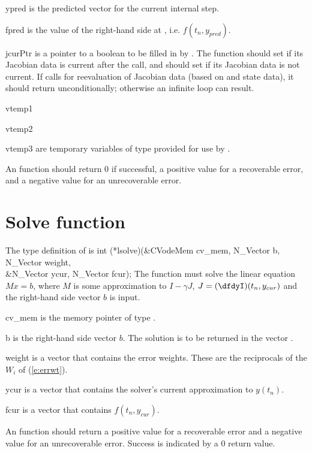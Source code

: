 {\begin{args}[convfail]
   \item[ypred]
     is the predicted  vector for the current {\cvodes} internal step.
  
   \item[fpred]
     is the value of the right-hand side at , i.e. $f(t_n, y_{pred})$.
  
   \item[jcurPtr]
     is a pointer to a boolean to be filled in by .  
     The function should set  if its Jacobian 
     data is current after the call, and should set         
      if its Jacobian data is not current.   
     If  calls for reevaluation of         
     Jacobian data (based on  and {\cvodes} state      
     data), it should return  unconditionally;
     otherwise an infinite loop can result.                
    
   \item[vtemp1] 
   \item[vtemp2]
   \item[vtemp3] 
     are temporary variables of type  provided for use by .      
  
   \end{args}
}
{
  An  function should return $0$ if successful,            
  a positive value for a recoverable error, and a negative value  
  for an unrecoverable error.  
}
{}


\section{Solve function}
The type definition of  is
{
  int (*lsolve)(&CVodeMem cv\_mem, N\_Vector b, N\_Vector weight, \\
                &N\_Vector ycur, N\_Vector fcur);  
}
{
  The function  must solve the linear equation $M x = b$, where         
  $M$ is some approximation to $I - \gamma J$, $J = (\dfdyI)(t_n, y_{cur})$  
  and the right-hand side vector $b$ is input. 
}
{
  \begin{args}[cv\_mem]
  \item[cv\_mem]
    is the {\cvodes} memory pointer of type .
  \item[b]
    is the right-hand side vector $b$. The solution is to be    
    returned in the vector .
  \item[weight]
    is a vector that contains the error weights.
    These are the reciprocals of the $W_i$ of (\ref{e:errwt}).
  \item[ycur]
    is a vector that contains the solver's current approximation to $y(t_n)$.
  \item[fcur]
    is a vector that contains $f(t_n,y_{cur})$. 
  \end{args}
}
{
  An  function should return a positive value    
  for a recoverable error and a negative value for an             
  unrecoverable error. Success is indicated by a $0$ return value.
}
{}

